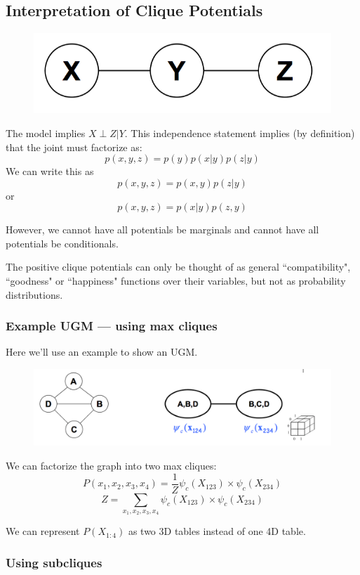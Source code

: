 \documentclass[twoside]{article}
\begin{document}
\subsection{Interpretation of Clique Potentials}

\begin{figure}[!ht]
 \centering
 \includegraphics[width=.4\linewidth]{assets/clique_potential.png}
\end{figure}

The model implies \(X\perp Z|Y\). This independence statement implies (by definition) that the joint must factorize as:\[p(x,y,z)=p(y)p(x|y)p(z|y)\]
We can write this as \[p(x,y,z)=p(x,y)p(z|y)\] or \[p(x,y,z)=p(x|y)p(z,y)\]

However, we cannot have all potentials be marginals and cannot have all potentials be conditionals.

The positive clique potentials can only be thought of as general ``compatibility", ``goodness" or ``happiness" functions over their variables, but not as probability distributions.

\subsubsection{Example UGM --- using max cliques}

Here we'll use an example to show an UGM.

\begin{figure}[!h]
	\centering
    \includegraphics[width=.8\linewidth]{assets/ugm_max_clique.png}
\end{figure}

We can factorize the graph into two max cliques:
\[P(x_1,x_2,x_3,x_4)=\frac{1}{Z}\psi_c(X_{123})\times \psi_c(X_{234})\]
\[Z=\sum_{x_1,x_2,x_3,x_4}\psi_c(X_{123})\times \psi_c(X_{234})\]

We can represent \(P(X_{1:4})\) as two 3D tables instead of one 4D table.

\subsubsection{Using subcliques}
\end{document}
